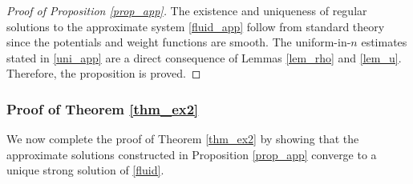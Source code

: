 \documentclass[10pt, reqno]{amsart}
\theoremstyle{definition}
\theoremstyle{remark}
\numberwithin{equation}{section}
\begin{document}
\begin{proof}[Proof of Proposition \ref{prop_app}]
The existence and uniqueness of regular solutions to the approximate system \eqref{fluid_app} follow from standard theory since the potentials and weight functions are smooth. The uniform-in-$n$ estimates stated in \eqref{uni_app} are a direct consequence of Lemmas \ref{lem_rho} and \ref{lem_u}. Therefore, the proposition is proved.
\end{proof}


%
%
%
%
%
\subsubsection{Proof of Theorem \ref{thm_ex2}}\label{ssec_thm_ex2}
We now complete the proof of Theorem \ref{thm_ex2} by showing that the approximate solutions constructed in Proposition \ref{prop_app} converge to a unique strong solution of \eqref{fluid}.
\end{document}
